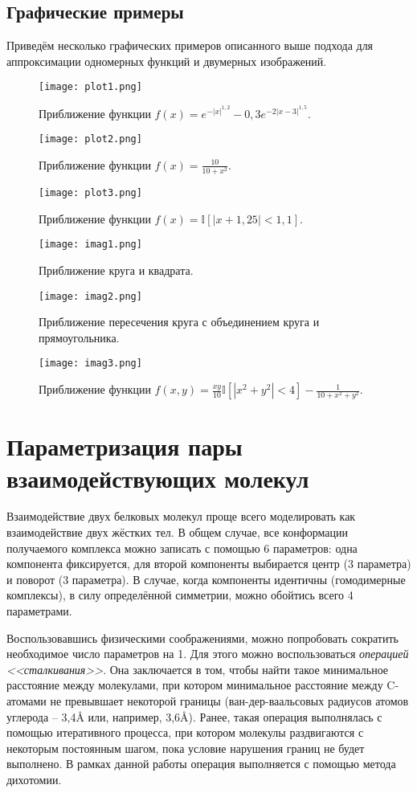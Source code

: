 \subsection{Графические примеры}
Приведём несколько графических примеров описанного выше подхода для аппроксимации одномерных функций и двумерных изображений.
\begin{figure}[H]
	\centering
	\texttt{[image: plot1.png]}
	\caption{Приближение функции $f(x) = e^{-|x|^{1,2}} - 0,3e^{-2|x-3|^{1,5}}$.}
	\label{fig_plot1}
\end{figure}
\begin{figure}[H]
	\centering
	\texttt{[image: plot2.png]}
	\caption{Приближение функции $f(x) = \frac{10}{10 + x^2}$.}
	\label{fig_plot2}
\end{figure}
\begin{figure}[H]
	\centering
	\texttt{[image: plot3.png]}
	\caption{Приближение функции $f(x) = \mathbb{I}[|x + 1,25| < 1,1]$.}
	\label{fig_plot3}
\end{figure}
\begin{figure}[H]
	\centering
	\texttt{[image: imag1.png]}
	\caption{Приближение круга и квадрата.}
	\label{fig_imag1}
\end{figure}
\begin{figure}[H]
	\centering
	\texttt{[image: imag2.png]}
	\caption{Приближение пересечения круга с объединением круга и прямоугольника.}
	\label{fig_imag2}
\end{figure}
\begin{figure}[H]
	\centering
	\texttt{[image: imag3.png]}
	\caption{Приближение функции $f(x, y) = \frac{xy}{10}\mathbb{I}[|x^2 + y^2| < 4] - \frac{1}{10 + x^2 + y^2}$.}
	\label{fig_imag3}
\end{figure}

\section{Параметризация пары взаимодействующих молекул}
Взаимодействие двух белковых молекул проще всего моделировать как взаимодействие двух жёстких тел. В общем случае, все конформации получаемого комплекса можно записать с помощью 6 параметров: одна компонента фиксируется, для второй компоненты выбирается центр (3 параметра) и поворот (3 параметра). В случае, когда компоненты идентичны (гомодимерные комплексы), в силу определённой симметрии, можно обойтись всего 4 параметрами.

Воспользовавшись физическими соображениями, можно попробовать сократить необходимое число параметров на 1. Для этого можно воспользоваться \textit{операцией <<сталкивания>>}\cite{prip2023}. Она заключается в том, чтобы найти такое минимальное расстояние между молекулами, при котором минимальное расстояние между C\textalpha-атомами не превывшает некоторой границы (ван-дер-ваальсовых радиусов атомов углерода -- 3,4\AA{} или, например, 3,6\AA{}). Ранее, такая операция выполнялась с помощью итеративного процесса, при котором молекулы раздвигаются с некоторым постоянным шагом, пока условие нарушения границ не будет выполнено. В рамках данной работы операция выполняется с помощью метода дихотомии.

